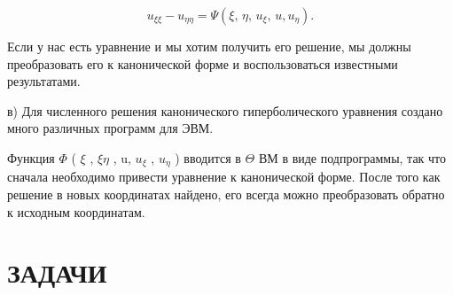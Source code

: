 \documentclass[
  ukrainian,
]{article}
\begin{document}
\[
u_{\xi\xi} - u_{\eta\eta} = \Psi(\xi, \, \eta, \, u_{\xi}, \, u, u_{\eta}).
\]

Если у нас есть уравнение и мы хотим получить его решение, мы должны
преобразовать его к канонической форме и воспользоваться известными
результатами.

в) Для численного решения канонического гиперболического уравнения
создано много различных программ для ЭВМ.

Функция \(\Phi\) ( \(\xi\) , \(\xi \eta\) , u, \(u_{\xi}\) ,
\(u_{\eta}\) ) вводится в \(\Theta\) ВМ в виде подпрограммы, так что
сначала необходимо привести уравнение к канонической форме. После того
как решение в новых координатах найдено, его всегда можно преобразовать
обратно к исходным координатам.

\section{ЗАДАЧИ}\label{ux437ux430ux434ux430ux447ux438-9}
\end{document}
